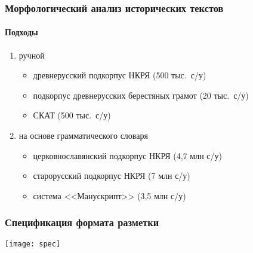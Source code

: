 \begin{frame}
  \frametitle{Морфологический анализ исторических текстов}
  \framesubtitle{Подходы}

  \begin{block}{}
    \begin{enumerate}
      \item<1-> ручной
      \begin{itemize}
        \item древнерусский подкорпус НКРЯ (500 тыс.\ с/у)
        \item подкорпус древнерусских берестяных грамот (20 тыс.\ с/у)
        \item \alert<3->{СКАТ} (500 тыс.\ с/у)
      \end{itemize}
      \item<2-> на основе грамматического словаря
      \begin{itemize}
        \item церковнославянский подкорпус НКРЯ (4,7 млн с/у)
        \item старорусский подкорпус НКРЯ (7 млн с/у)
        \item система <<Манускрипт>> (3,5 млн с/у)
      \end{itemize}
    \end{enumerate}
  \end{block}
\end{frame}

\begin{frame}
  \frametitle{Спецификация формата разметки}

  \begin{center}
    \texttt{[image: spec]}
  \end{center}
\end{frame}


